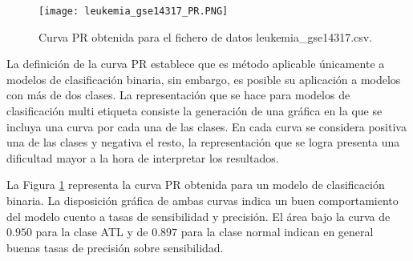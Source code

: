 \bigbreak

\begin{figure}[htp]
    \centering
    \texttt{[image: leukemia\_gse14317\_PR.PNG]}
    \caption{Curva PR obtenida para el fichero de datos leukemia\_gse14317.csv.}
    \label{fig:6}
\end{figure}

La definición de la curva PR establece que es método aplicable únicamente a modelos de clasificación binaria, sin embargo, es posible su aplicación a modelos con más de dos clases. La representación que se hace para modelos de clasificación multi etiqueta consiste la generación de una gráfica en la que se incluya una curva por cada una de las clases. En cada curva se considera positiva una de las clases y negativa el resto, la representación que se logra presenta una dificultad mayor a la hora de interpretar los resultados.

\bigbreak

La Figura \ref{fig:6} representa la curva PR obtenida para un modelo de clasificación binaria. La disposición gráfica de ambas curvas indica un buen comportamiento del modelo cuento a tasas de sensibilidad y precisión. El área bajo la curva de $0.950$ para la clase ATL y de $0.897$ para la clase normal indican en general buenas tasas de precisión sobre sensibilidad.

\clearpage